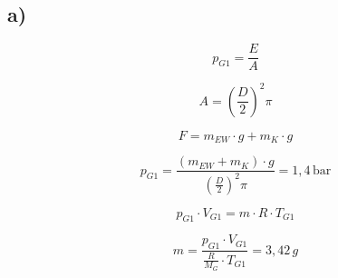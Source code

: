 

\subsection*{a)}

\[
p_{G1} = \frac{E}{A}
\]

\[
A = \left(\frac{D}{2}\right)^2 \pi
\]

\[
F = m_{EW} \cdot g + m_{K} \cdot g
\]

\[
p_{G1} = \frac{(m_{EW} + m_{K}) \cdot g}{\left(\frac{D}{2}\right)^2 \pi} = 1,4 \, \text{bar}
\]

\[
p_{G1} \cdot V_{G1} = m \cdot R \cdot T_{G1}
\]

\[
m = \frac{p_{G1} \cdot V_{G1}}{\frac{R}{M_G} \cdot T_{G1}} = 3,42 \, g
\]